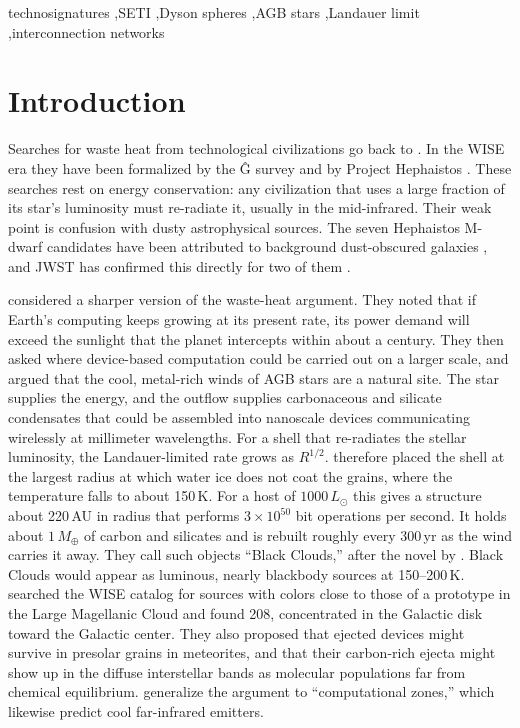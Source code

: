 \documentclass[final,5p]{elsarticle}
\newcommand{\Lsun}{L_\odot}
\newcommand{\Mearth}{M_\oplus}
\begin{document}
\begin{frontmatter}
\begin{keyword}
technosignatures \sep SETI \sep Dyson spheres \sep AGB stars \sep Landauer limit \sep interconnection networks
\end{keyword}

\end{frontmatter}

\section{Introduction}

Searches for waste heat from technological civilizations go back to \citet{Dyson1960}. In the WISE era they have been formalized by the \^G survey \citep{Wright2014a,Wright2014b,Wright2019} and by Project Hephaistos \citep{Suazo2022,Suazo2024}. These searches rest on energy conservation: any civilization that uses a large fraction of its star's luminosity must re-radiate it, usually in the mid-infrared. Their weak point is confusion with dusty astrophysical sources. The seven Hephaistos M-dwarf candidates have been attributed to background dust-obscured galaxies \citep{Ren2024,Blain2024}, and JWST has confirmed this directly for two of them \citep{Zackrisson2026}.

\citet{LaughlinAdams2021} considered a sharper version of the waste-heat argument. They noted that if Earth's computing keeps growing at its present rate, its power demand will exceed the sunlight that the planet intercepts within about a century. They then asked where device-based computation could be carried out on a larger scale, and argued that the cool, metal-rich winds of AGB stars are a natural site. The star supplies the energy, and the outflow supplies carbonaceous and silicate condensates that could be assembled into nanoscale devices communicating wirelessly at millimeter wavelengths. For a shell that re-radiates the stellar luminosity, the Landauer-limited rate \citep{Landauer1961,Bennett1982,Lloyd2000} grows as $R^{1/2}$. \citet{LaughlinAdams2021} therefore placed the shell at the largest radius at which water ice does not coat the grains, where the temperature falls to about 150\,K. For a host of $1000\,\Lsun$ this gives a structure about 220\,AU in radius that performs $3\times10^{50}$ bit operations per second. It holds about $1\,\Mearth$ of carbon and silicates and is rebuilt roughly every 300\,yr as the wind carries it away. They call such objects ``Black Clouds,'' after the novel by \citet{Hoyle1957}. Black Clouds would appear as luminous, nearly blackbody sources at 150--200\,K. \citet{LaughlinAdams2021} searched the WISE catalog for sources with colors close to those of a prototype in the Large Magellanic Cloud and found 208, concentrated in the Galactic disk toward the Galactic center. They also proposed that ejected devices might survive in presolar grains in meteorites, and that their carbon-rich ejecta might show up in the diffuse interstellar bands as molecular populations far from chemical equilibrium. \citet{ScharfWitkowski2024} generalize the argument to ``computational zones,'' which likewise predict cool far-infrared emitters.
\end{document}
